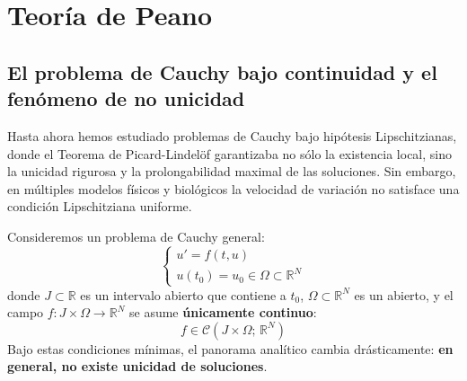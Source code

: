 ﻿\section{Teoría de Peano}

\subsection{El problema de Cauchy bajo continuidad y el fenómeno de no unicidad}

Hasta ahora hemos estudiado problemas de Cauchy bajo hipótesis Lipschitzianas, donde el Teorema de Picard-Lindelöf garantizaba no sólo la existencia local, sino la unicidad rigurosa y la prolongabilidad maximal de las soluciones. Sin embargo, en múltiples modelos físicos y biológicos la velocidad de variación no satisface una condición Lipschitziana uniforme.

Consideremos un problema de Cauchy general:
\[
    \begin{cases}
        u' = f(t, u) \\
        u(t_0) = u_0 \in \Omega \subset \mathbb{R}^N
    \end{cases}
\]
donde $J \subset \mathbb{R}$ es un intervalo abierto que contiene a $t_0$, $\Omega \subset \mathbb{R}^N$ es un abierto, y el campo $f: J \times \Omega \to \mathbb{R}^N$ se asume \textbf{únicamente continuo}:
\[
    f \in \mathcal{C}(J \times \Omega; \, \mathbb{R}^N)
\]
Bajo estas condiciones mínimas, el panorama analítico cambia drásticamente: \textbf{en general, no existe unicidad de soluciones}.

